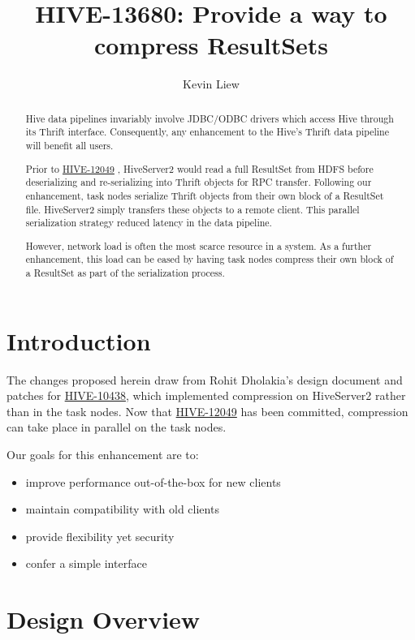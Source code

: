\documentclass[11pt,a4paper]{article}
\title{HIVE-13680: Provide a way to compress ResultSets}
\author{Kevin Liew}
\begin{document}
\maketitle

\begin{abstract}
	Hive data pipelines invariably involve JDBC/ODBC drivers which access Hive through its Thrift interface. 
	Consequently, any enhancement to the Hive's Thrift data pipeline will benefit all users.
	
	Prior to 
	\href{https://issues.apache.org/jira/browse/HIVE-12049}{HIVE-12049}
	, HiveServer2 would read a full ResultSet from HDFS before deserializing and re-serializing into Thrift objects for RPC transfer.
	Following our enhancement, task nodes serialize Thrift objects from their own block of a ResultSet file. 
	HiveServer2 simply transfers these objects to a remote client. 
	This parallel serialization strategy reduced latency in the data pipeline.
	
	However, network load is often the most scarce resource in a system. 
	As a further enhancement, this load can be eased by having task nodes compress their own block of a ResultSet as part of the serialization process.
\end{abstract}

\section{Introduction}
	The changes proposed herein draw from Rohit Dholakia's design document and patches for
	\href{https://issues.apache.org/jira/browse/HIVE-10438}{HIVE-10438}, which implemented compression on HiveServer2 rather than in the task nodes.
	Now that
	\href{https://issues.apache.org/jira/browse/HIVE-12049}{HIVE-12049}
	has been committed, compression can take place in parallel on the task nodes.
	
	Our goals for this enhancement are to:
	\begin{itemize}
		\item improve performance out-of-the-box for new clients
		\item maintain compatibility with old clients
		\item provide flexibility yet security
		\item confer a simple interface
	\end{itemize}
	
\section{Design Overview}
\end{document}
